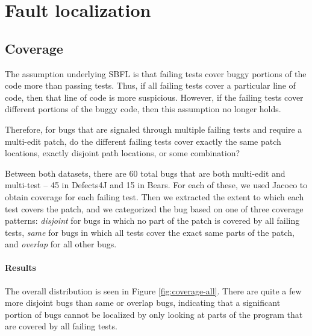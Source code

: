 \section{Fault localization}


\subsection{Coverage}


The assumption underlying SBFL is that failing tests cover buggy portions of 
the code more than passing tests. Thus, if all failing tests cover a particular 
line of code, then that line of code is more suspicious. However, if the 
failing tests cover different portions of the buggy code, then this assumption 
no longer holds.

Therefore, for bugs that are signaled through multiple failing tests and 
require a multi-edit patch, do the different failing tests cover exactly the 
same patch locations, exactly disjoint path locations, or some combination?

Between both datasets, there are 60 total bugs that are both multi-edit and 
multi-test -- 45 in Defects4J and 15 in Bears. For each of these, we used 
Jacoco to obtain coverage for each failing test. Then we extracted the extent 
to which each test covers the patch, and we categorized the bug based on one of 
three coverage patterns: \textit{disjoint} for bugs in which no part of the 
patch is covered by all failing tests, \textit{same} for bugs in which all 
tests cover the exact same parts of the patch, and \textit{overlap} for all 
other bugs.


\paragraph{Results}
The overall distribution is seen in Figure \ref{fig:coverage-all}. There are 
quite 
a few more disjoint bugs  than same or overlap bugs, indicating that a significant portion of 
bugs cannot be localized by only looking at parts of the program that are 
covered by all failing tests.

